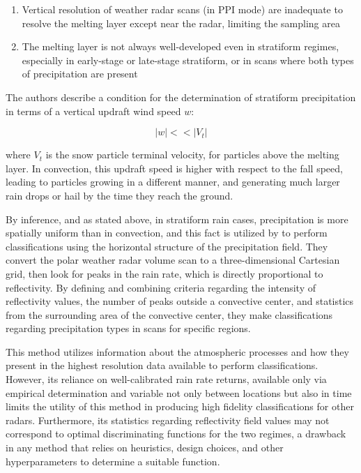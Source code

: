 \begin{enumerate}
	\item Vertical resolution of weather radar scans (in PPI mode) are inadequate to resolve the melting layer except near the radar, limiting the sampling area
	\item The melting layer is not always well-developed even in stratiform regimes, especially in early-stage or late-stage stratiform, or in scans where both types of precipitation are present
\end{enumerate}

The authors describe a condition for the determination of stratiform precipitation in terms of a vertical updraft wind speed $w$:

\begin{equation}
|w| << |V_t|
\end{equation}

where $V_t$ is the snow particle terminal velocity, for particles above the melting layer.
In convection, this updraft speed is higher with respect to the fall speed, leading to particles growing in a different manner, and generating much larger rain drops or hail by the time they reach the ground.

By inference, and as stated above, in stratiform rain cases, precipitation is more spatially uniform than in convection, and this fact is utilized by \cite{steiner1995climatological} to perform classifications using the horizontal structure of the precipitation field. 
They convert the polar weather radar volume scan to a three-dimensional Cartesian grid, then look for peaks in the rain rate, which is directly proportional to reflectivity.
By defining and combining criteria regarding the intensity of reflectivity values, the number of peaks outside a convective center, and statistics from the surrounding area of the convective center, they make classifications regarding precipitation types in scans for specific regions.

This method utilizes information about the atmospheric processes and how they present in the highest resolution data available to perform classifications. 
However, its reliance on well-calibrated rain rate returns, available only via empirical determination and variable not only between locations but also in time limits the utility of this method in producing high fidelity classifications for other radars.
Furthermore, its statistics regarding reflectivity field values may not correspond to optimal discriminating functions for the two regimes, a drawback in any method that relies on heuristics, design choices, and other hyperparameters to determine a suitable function.

